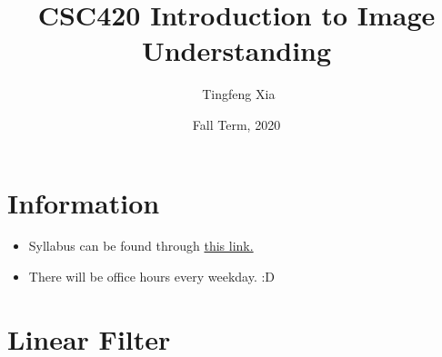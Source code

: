 \documentclass[11pt]{article}
\author{\ccLogo \,\,Tingfeng Xia}
\title{CSC420 Introduction to Image Understanding}
\date{Fall Term, 2020}
\begin{document}
\maketitle
\doclicenseThis
\section*{Information}
\begin{itemize}
	\item Syllabus can be found through \href{https://q.utoronto.ca/courses/181228/files/8680178/preview}{this link. }
	\item There will be office hours every weekday. :D
\end{itemize}
\tableofcontents
\newpage

\section{Linear Filter}
\end{document}
